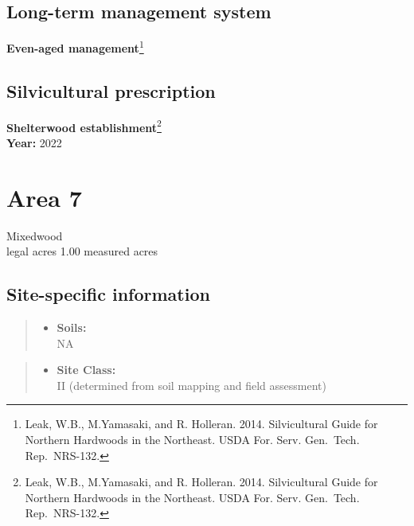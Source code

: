 \documentclass[]{tufte-handout}
\providecommand{\tightlist}{%
  \setlength{\itemsep}{0pt}\setlength{\parskip}{0pt}}
\begin{document}
\subsection{Long-term management
system}\label{long-term-management-system-5}

\textbf{Even-aged management}\footnote{Leak, W.B., M.Yamasaki, and R.
  Holleran. 2014. Silvicultural Guide for Northern Hardwoods in the
  Northeast. USDA For. Serv. Gen.~Tech. Rep.~NRS-132.}

\subsection{Silvicultural
prescription}\label{silvicultural-prescription-5}

\textbf{Shelterwood establishment}\footnote{Leak, W.B., M.Yamasaki, and
  R. Holleran. 2014. Silvicultural Guide for Northern Hardwoods in the
  Northeast. USDA For. Serv. Gen.~Tech. Rep.~NRS-132.}\\
\textbf{Year:} 2022

\newpage

\section{Area 7}\label{area-7}

Mixedwood\\
 legal acres \textbar{} 1.00 measured acres

\subsection{Site-specific
information}\label{site-specific-information-6}

\begin{quote}
\begin{itemize}
\tightlist
\item
  \textbf{Soils:}\\
  \indent\indent  NA
\end{itemize}
\end{quote}

\begin{quote}
\begin{itemize}
\tightlist
\item
  \textbf{Site Class:}\\
  \vspace{2pt} II (determined from soil mapping and field assessment)
\end{itemize}
\end{quote}
\end{document}
